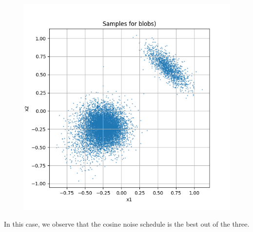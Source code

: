 \documentclass[a4paper,12pt]{article}
\begin{document}
\begin{figure}[H]
\begin{minipage}{0.3\textwidth}
  \end{minipage}
  \begin{minipage}{0.3\textwidth}
      \centering
      \includegraphics[width=\linewidth]{images/Samples for ddpm_2_200_0.0001_0.02_blobs_sigmoid.png}
  \end{minipage}
\end{figure}
In this case, we observe that the cosine noise schedule is the best out of the three.
\end{document}
